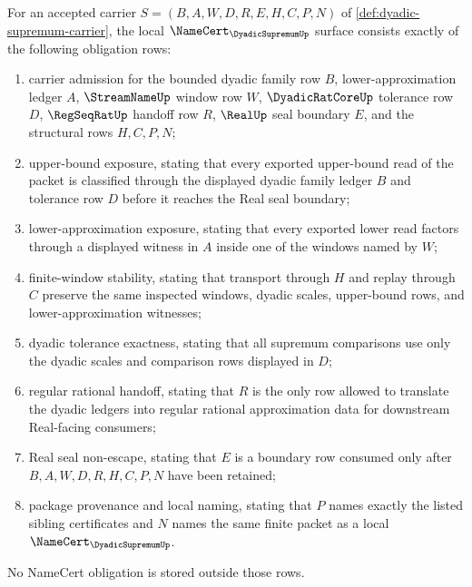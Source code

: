 \begin{theorem}
\label{thm:dyadic-supremum-namecert-obligations}
For an accepted carrier $S=(B,A,W,D,R,E,H,C,P,N)$ of \autoref{def:dyadic-supremum-carrier}, the local $\NameCert_{\DyadicSupremumUp}$ surface consists exactly of the following obligation rows:
\begin{enumerate}
\item carrier admission for the bounded dyadic family row $B$, lower-approximation ledger $A$, $\StreamNameUp$ window row $W$, $\DyadicRatCoreUp$ tolerance row $D$, $\RegSeqRatUp$ handoff row $R$, $\RealUp$ seal boundary $E$, and the structural rows $H,C,P,N$;
\item upper-bound exposure, stating that every exported upper-bound read of the packet is classified through the displayed dyadic family ledger $B$ and tolerance row $D$ before it reaches the Real seal boundary;
\item lower-approximation exposure, stating that every exported lower read factors through a displayed witness in $A$ inside one of the windows named by $W$;
\item finite-window stability, stating that transport through $H$ and replay through $C$ preserve the same inspected windows, dyadic scales, upper-bound rows, and lower-approximation witnesses;
\item dyadic tolerance exactness, stating that all supremum comparisons use only the dyadic scales and comparison rows displayed in $D$;
\item regular rational handoff, stating that $R$ is the only row allowed to translate the dyadic ledgers into regular rational approximation data for downstream Real-facing consumers;
\item Real seal non-escape, stating that $E$ is a boundary row consumed only after $B,A,W,D,R,H,C,P,N$ have been retained;
\item package provenance and local naming, stating that $P$ names exactly the listed sibling certificates and $N$ names the same finite packet as a local $\NameCert_{\DyadicSupremumUp}$.
\end{enumerate}
No NameCert obligation is stored outside those rows.
\end{theorem}

